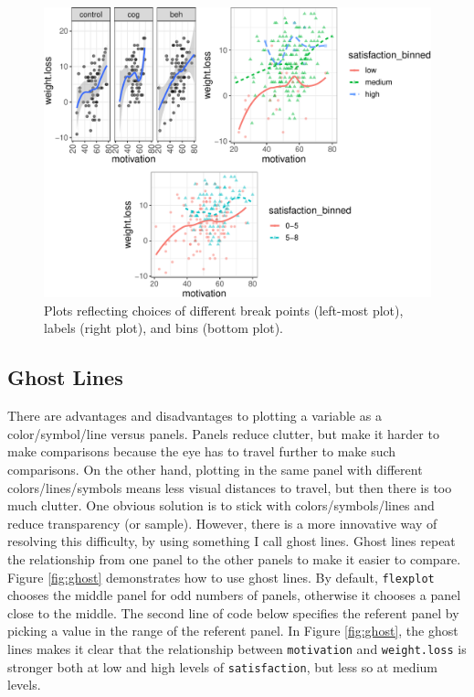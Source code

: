 \documentclass[
  english,
  man]{apa6}
\begin{document}
\normalsize

\small

\begin{figure}

{\centering \includegraphics[width=1\linewidth]{flexplot_psychmeth_files/figure-latex/panels2-1} 

}

\caption{Plots reflecting choices of different break points (left-most plot), labels (right plot), and bins (bottom plot). \label{fig:panels2}}\label{fig:panels2}
\end{figure}

\normalsize

\hypertarget{ghost-lines}{%
\subsection{Ghost Lines}\label{ghost-lines}}

There are advantages and disadvantages to plotting a variable as a color/symbol/line versus panels. Panels reduce clutter, but make it harder to make comparisons because the eye has to travel further to make such comparisons. On the other hand, plotting in the same panel with different colors/lines/symbols means less visual distances to travel, but then there is too much clutter. One obvious solution is to stick with colors/symbols/lines and reduce transparency (or sample). However, there is a more innovative way of resolving this difficulty, by using something I call ghost lines. Ghost lines repeat the relationship from one panel to the other panels to make it easier to compare. Figure \ref{fig:ghost} demonstrates how to use ghost lines. By default, \texttt{flexplot} chooses the middle panel for odd numbers of panels, otherwise it chooses a panel close to the middle. The second line of code below specifies the referent panel by picking a value in the range of the referent panel. In Figure \ref{fig:ghost}, the ghost lines makes it clear that the relationship between \texttt{motivation} and \texttt{weight.loss} is stronger both at low and high levels of \texttt{satisfaction}, but less so at medium levels.
\end{document}
